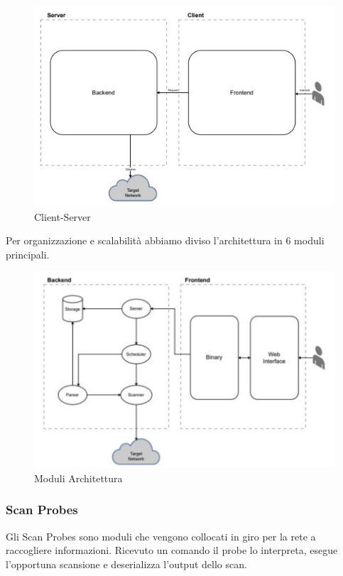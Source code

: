 \documentclass[target=bach,aauheader=,style=]{thud}
\begin{document}
\begin{figure}[h]
  \includegraphics[width=\columnwidth]{client_server}
  \centering
  \caption{Client-Server}
  \label{client-server}
\end{figure}

\FloatBarrier

Per organizzazione e scalabilità abbiamo diviso l'architettura in 6 moduli principali.


\begin{figure}[h]
  \includegraphics[width=\columnwidth]{moduli}
  \centering
  \caption{Moduli Architettura}
  \label{moduli}
\end{figure}

\FloatBarrier

\subsubsection{Scan Probes}
Gli Scan Probes sono moduli che vengono collocati in giro per la rete a raccogliere informazioni. 
Ricevuto un comando il probe lo interpreta, esegue l'opportuna scansione e deserializza l'output dello scan.
\end{document}
